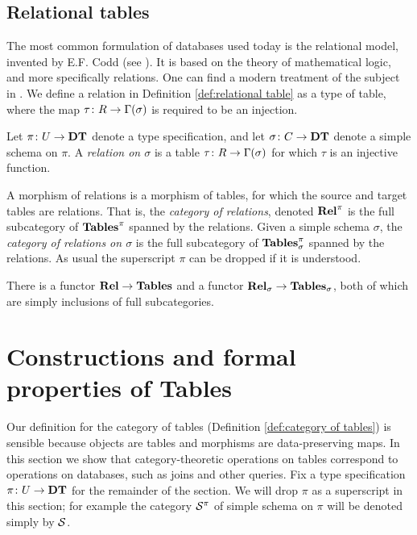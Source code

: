 \documentclass{amsart}
\begin{document}
\subsection{Relational tables}

The most common formulation of databases used today is the relational model, invented by E.F. Codd (see \cite{Cod}).  It is based on the theory of mathematical logic, and more specifically relations.  One can find a modern treatment of the subject in \cite{Dat}.  We define a relation in Definition \ref{def:relational table} as a type of table, where the map $\tau\colon R\rightarrow\Gamma(\sigma)$ is required to be an injection.

\begin{definition}\label{def:relational table}

Let $\pi\colon U\rightarrow{\bf DT}$ denote a type specification, and let $\sigma\colon C\rightarrow{\bf DT}$ denote a simple schema on $\pi$.  A {\em relation on $\sigma$} is a table $\tau\colon R\rightarrow\Gamma(\sigma)$ for which $\tau$ is an injective function.  

A morphism of relations is a morphism of tables, for which the source and target tables are relations.  That is, the {\em category of relations}, denoted ${\bf Rel}^\pi$ is the full subcategory of ${\bf Tables}^\pi$ spanned by the relations.  Given a simple schema $\sigma$, the {\em category of relations on $\sigma$} is the full subcategory of ${\bf Tables}^\pi_\sigma$ spanned by the relations.  As usual the superscript $\pi$ can be dropped if it is understood.

There is a functor ${\bf Rel}\rightarrow{\bf Tables}$ and a functor ${\bf Rel}_\sigma\rightarrow{\bf Tables}_\sigma$, both of which are simply inclusions of full subcategories.

\end{definition}

\section{Constructions and formal properties of Tables}\label{sec:constructions for tables}

\setcounter{subsection}{1}

Our definition for the category of tables (Definition \ref{def:category of tables}) is sensible because objects are tables and morphisms are data-preserving maps.  In this section we show that category-theoretic operations on tables correspond to operations on databases, such as joins and other queries.  Fix a type specification $\pi\colon U\rightarrow{\bf DT}$ for the remainder of the section.  We will drop $\pi$ as a superscript in this section; for example the category $\mathcal{S}^\pi$ of simple schema on $\pi$ will be denoted simply by $\mathcal{S}$.
\end{document}
